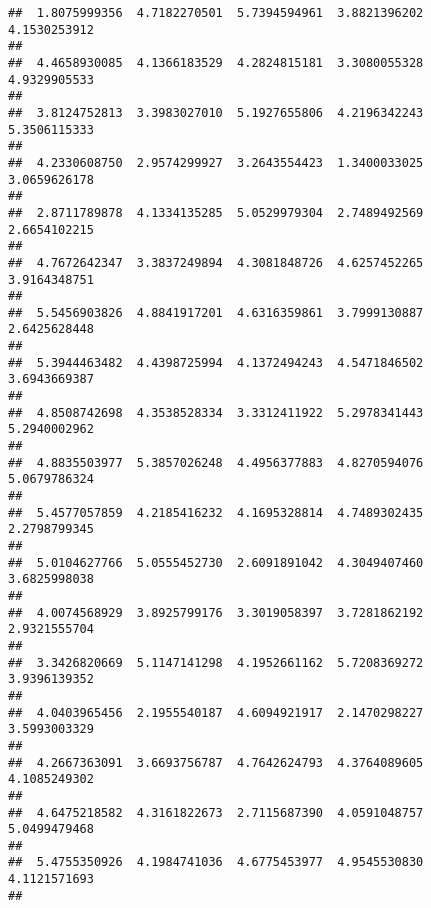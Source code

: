 \documentclass[]{article}
\begin{document}
\begin{verbatim}
##  1.8075999356  4.7182270501  5.7394594961  3.8821396202  4.1530253912 
##                                                                       
##  4.4658930085  4.1366183529  4.2824815181  3.3080055328  4.9329905533 
##                                                                       
##  3.8124752813  3.3983027010  5.1927655806  4.2196342243  5.3506115333 
##                                                                       
##  4.2330608750  2.9574299927  3.2643554423  1.3400033025  3.0659626178 
##                                                                       
##  2.8711789878  4.1334135285  5.0529979304  2.7489492569  2.6654102215 
##                                                                       
##  4.7672642347  3.3837249894  4.3081848726  4.6257452265  3.9164348751 
##                                                                       
##  5.5456903826  4.8841917201  4.6316359861  3.7999130887  2.6425628448 
##                                                                       
##  5.3944463482  4.4398725994  4.1372494243  4.5471846502  3.6943669387 
##                                                                       
##  4.8508742698  4.3538528334  3.3312411922  5.2978341443  5.2940002962 
##                                                                       
##  4.8835503977  5.3857026248  4.4956377883  4.8270594076  5.0679786324 
##                                                                       
##  5.4577057859  4.2185416232  4.1695328814  4.7489302435  2.2798799345 
##                                                                       
##  5.0104627766  5.0555452730  2.6091891042  4.3049407460  3.6825998038 
##                                                                       
##  4.0074568929  3.8925799176  3.3019058397  3.7281862192  2.9321555704 
##                                                                       
##  3.3426820669  5.1147141298  4.1952661162  5.7208369272  3.9396139352 
##                                                                       
##  4.0403965456  2.1955540187  4.6094921917  2.1470298227  3.5993003329 
##                                                                       
##  4.2667363091  3.6693756787  4.7642624793  4.3764089605  4.1085249302 
##                                                                       
##  4.6475218582  4.3161822673  2.7115687390  4.0591048757  5.0499479468 
##                                                                       
##  5.4755350926  4.1984741036  4.6775453977  4.9545530830  4.1121571693 
##                                                                       

\end{verbatim}
\end{document}
